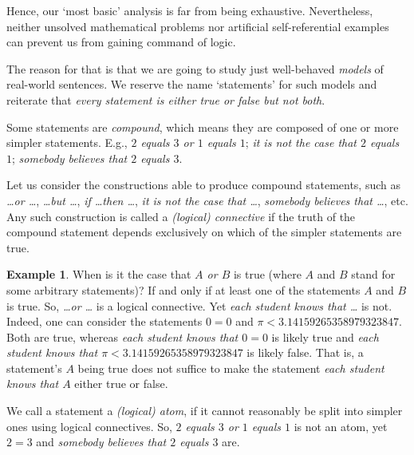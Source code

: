 \documentclass[12pt,notitlepage]{article}
\theoremstyle{plain}
\theoremstyle{definition}
\newtheorem{exm}[thm]{Example}
\theoremstyle{plain}
\newcommand{\1}{\mathbf{1}}
\newcommand{\0}{\mathbf{0}}
\newcommand{\mcomm}[1]{}
\begin{document}
\mcomm{It is not recommended to discuss any paradoxes at length.}

Hence, our `most basic' analysis is far from being exhaustive. Nevertheless, neither unsolved mathematical problems nor artificial self-referential examples can prevent us from gaining command of logic.

The reason for that is that we are going to study just well-behaved \emph{models} of real-world sentences. We reserve the name `statements' for such models and reiterate that \emph{every statement is either true or false but not both}.

\medskip
Some statements are \emph{compound}, which means they are composed of one or more simpler statements. E.g., \emph{$2$ equals $3$ or $1$ equals $1$}; \emph{it is not the case that $2$ equals $1$}; \emph{somebody believes that $2$ equals $3$}.

Let us consider the constructions able to produce compound statements, such as \emph{\dots or \dots}, \emph{\dots but \dots}, \emph{if \dots then \dots}, \emph{it is not the case that \dots}, \emph{somebody believes that \dots}, etc. Any such construction is called a \emph{(logical) connective} if the truth of the compound statement depends exclusively on which of the simpler statements are true.
\begin{exm}\label{L1:exm_pi}
When is it the case that \emph{$A$ or $B$} is true (where $A$ and $B$ stand for some arbitrary statements)? If and only if at least one of the statements  $A$ and $B$ is true. So, \emph{\dots or \dots} is a logical connective. Yet \emph{each student knows that \dots} is not. Indeed, one can consider the statements $0 = 0$ and $\pi < 3.14159265358979323847$. Both are true, whereas \emph{each student knows that $0 = 0$} is likely true and \emph{each student knows that $\pi < 3.14159265358979323847$} is likely false. That is, a statement's $A$ being true does not  suffice to make the statement \emph{each student knows that $A$} either true or false.
\end{exm}

We call a statement a \emph{(logical) atom}, if it cannot reasonably be split into simpler ones using logical connectives. So, \emph{$2$ equals $3$ or $1$ equals $1$} is not an atom, yet $2 = 3$ and \emph{somebody believes that $2$ equals $3$} are.
\end{document}
